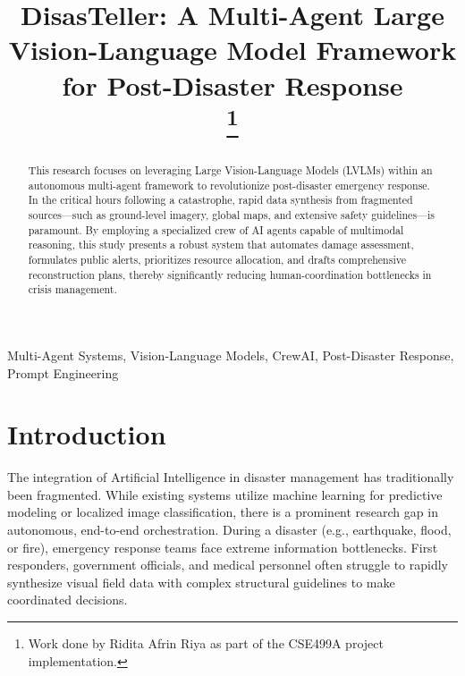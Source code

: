 \documentclass[conference,twocolumn,twoside]{IEEEtran}
\begin{document}
\title{DisasTeller: A Multi-Agent Large Vision-Language Model Framework for Post-Disaster Response\\
\thanks{Work done by Ridita Afrin Riya as part of the CSE499A project implementation.}
}

\author{
}

\maketitle

\begin{abstract}
This research focuses on leveraging Large Vision-Language Models (LVLMs) within an autonomous multi-agent framework to revolutionize post-disaster emergency response. In the critical hours following a catastrophe, rapid data synthesis from fragmented sources---such as ground-level imagery, global maps, and extensive safety guidelines---is paramount. By employing a specialized crew of AI agents capable of multimodal reasoning, this study presents a robust system that automates damage assessment, formulates public alerts, prioritizes resource allocation, and drafts comprehensive reconstruction plans, thereby significantly reducing human-coordination bottlenecks in crisis management.
\end{abstract}

\begin{IEEEkeywords}
Multi-Agent Systems, Vision-Language Models, CrewAI, Post-Disaster Response, Prompt Engineering
\end{IEEEkeywords}

\section{Introduction}
The integration of Artificial Intelligence in disaster management has traditionally been fragmented. While existing systems utilize machine learning for predictive modeling or localized image classification, there is a prominent research gap in autonomous, end-to-end orchestration. During a disaster (e.g., earthquake, flood, or fire), emergency response teams face extreme information bottlenecks. First responders, government officials, and medical personnel often struggle to rapidly synthesize visual field data with complex structural guidelines to make coordinated decisions.
\end{document}
